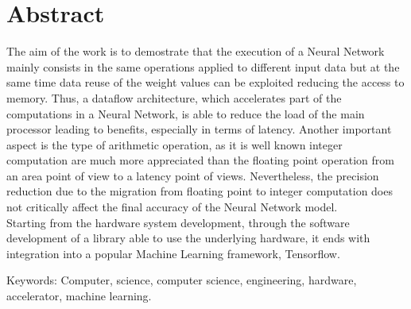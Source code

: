 
\thispagestyle{plain_cover}			%
\setlength{\parskip}{0pt plus 1.0pt}
\section*{Abstract}
The aim of the work is to demostrate that the execution of a Neural Network mainly consists in the same operations applied to different input data but at the same time data reuse of the weight values can be exploited reducing the access to memory. Thus, a dataflow architecture, which accelerates part of the computations in a Neural Network, is able to reduce the load of the main processor leading to benefits, especially in terms of latency.
Another important aspect is the type of arithmetic operation, as it is well known integer computation are much more appreciated than the floating point operation from an area point of view to a latency point of views. Nevertheless, the precision reduction due to the migration from floating point to integer computation does not critically affect the final accuracy of the Neural Network model.\\
Starting from the hardware system development, through the software development of a library able to use the underlying hardware, it ends with integration into a popular Machine Learning framework, Tensorflow.



\vfill
Keywords: Computer, science, computer science, engineering, hardware, accelerator, machine learning.

\newpage				%
\thispagestyle{empty}
\mbox{}